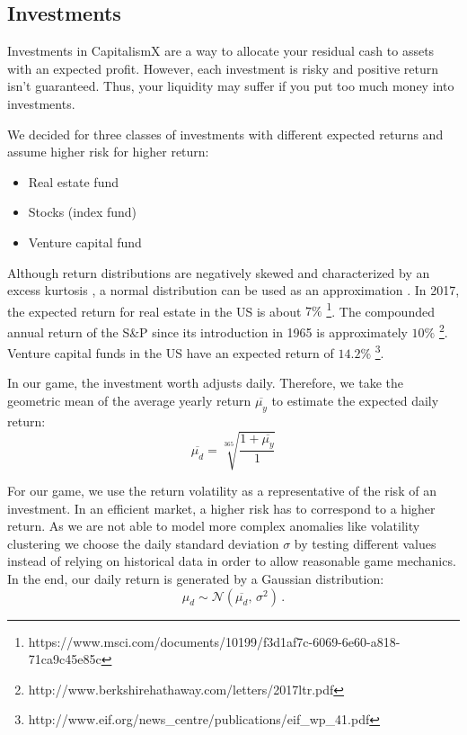 \subsection{Investments}

 Investments in CapitalismX are a way to allocate your residual cash to assets with an expected profit. However, each investment is risky and positive return isn't guaranteed. Thus, your liquidity may suffer if you put too much money into investments.
  
  We decided for three classes of investments with different expected returns and assume higher risk for higher return:
\begin{itemize}
	\item Real estate fund
	\item Stocks (index fund)
	\item Venture capital fund
\end{itemize}

Although return distributions are negatively skewed and characterized by an excess kurtosis \cite{ANDERSEN200143}, a normal distribution can be used as an approximation \cite{doi:10.1080/01621459.1972.10481297}. In 2017, the expected return for real estate in the US is about $7\%$ \footnote{https://www.msci.com/documents/10199/f3d1af7c-6069-6e60-a818-71ca9c45e85c}. The compounded annual return of the S\&P since its introduction in 1965 is approximately $10\%$ \footnote{http://www.berkshirehathaway.com/letters/2017ltr.pdf}. Venture capital funds in the US have an expected return of $14.2\%$ \footnote{http://www.eif.org/news\_centre/publications/eif\_wp\_41.pdf}.

In our game, the investment worth adjusts daily. Therefore, we take the geometric mean of the average yearly return $\overline{\mu_y}$ to estimate the expected daily return:
\begin{equation}
	\overline{\mu_d} = \sqrt[365]{\frac{1 + \overline{\mu_y}}{1}}
\end{equation}

For our game, we use the return volatility as a representative of the risk of an investment. In an efficient market, a higher risk has to correspond to a higher return. As we are not able to model more complex anomalies like volatility clustering we choose the daily standard deviation $\sigma$ by testing different values instead of relying on historical data in order to allow reasonable game mechanics. In the end, our daily return is generated by a Gaussian distribution:
\begin{equation}
	\mu_d \sim \mathcal{N}(\overline{\mu_d},\,\sigma^{2})\,.
\end{equation}
